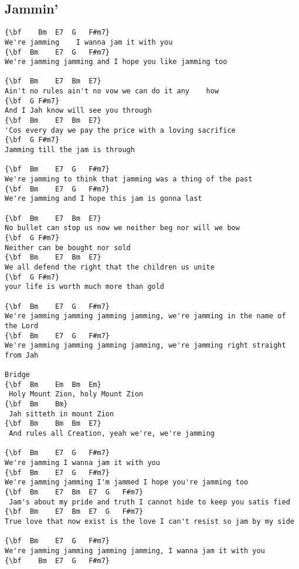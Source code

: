 \documentclass[a4paper]{article}
\begin{document}
\subsection{Jammin'} %
\label{sub:Jammin'}
\begin{Verbatim}[commandchars=\\\{\}]
{\bf 	Bm	E7	G	F#m7}
We're jamming    I wanna jam it with you   
{\bf  Bm	E7	G	F#m7}
We're jamming jamming and I hope you like jamming too   

{\bf  Bm	E7	Bm	E7}
Ain't no rules ain't no vow we can do it any	how  
{\bf  G	F#m7}
And I Jah know will see you through 
{\bf  Bm	E7	Bm	E7}
'Cos every day we pay the price with a loving sacrifice         
{\bf  G	F#m7}
Jamming till the jam is through  

{\bf  Bm	E7	G	F#m7}
We're jamming to think that jamming was a thing of the past
{\bf  Bm	E7	G	F#m7}
We're jamming and I hope this jam is gonna last

{\bf  Bm	E7	Bm	E7}
No bullet can stop us now we neither beg nor will we bow  
{\bf  G	F#m7}
Neither can be bought nor sold    
{\bf  Bm	E7	Bm	E7}
We all defend the right that the children us unite             
{\bf  G	F#m7}
your life is worth much more than gold

{\bf  Bm	E7	G	F#m7}
We're jamming jamming jamming jamming, we're jamming in the name of the Lord
{\bf  Bm	E7	G	F#m7}
We're jamming jamming jamming jamming, we're jamming right straight from Jah

Bridge
{\bf  Bm	Em	Bm	Em}
 Holy Mount Zion, holy Mount Zion
{\bf  Bm	Bm}
 Jah sitteth in mount Zion
{\bf  Bm	Bm	Bm	E7}
 And rules all Creation, yeah we're, we're jamming   

{\bf  Bm	E7	G	F#m7}
We're jamming I wanna jam it with you 
{\bf  Bm	E7	G	F#m7}
We're jamming jamming I'm jammed I hope you're jamming too 
{\bf  Bm	E7	Bm	E7	G	F#m7}
 Jam's about my pride and truth I cannot hide to keep you satis	fied    
{\bf  Bm	E7	Bm	E7	G	F#m7}
True love that now exist is the love I can't resist so jam by my side    

{\bf  Bm	E7	G	F#m7}
We're jamming jamming jamming jamming, I wanna jam it with you
{\bf  	Bm	E7	G	F#m7}
\end{Verbatim}
\newpage
\newpage
\end{document}
